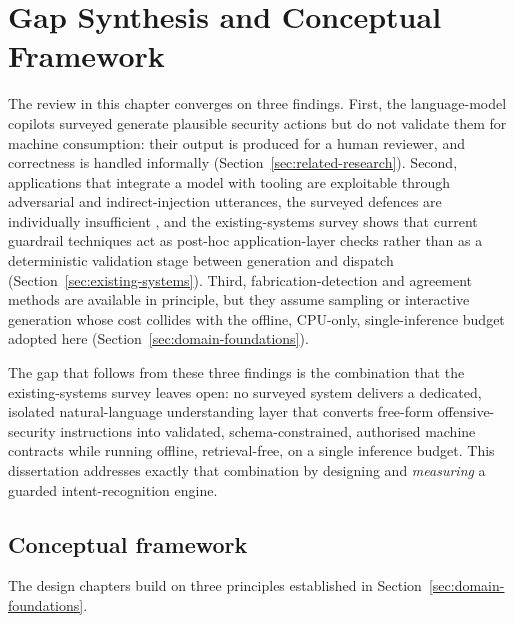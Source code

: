 
\section{Gap Synthesis and Conceptual Framework}\label{sec:gap-synthesis}

The review in this chapter converges on three findings. First, the
language-model copilots surveyed \parencite{deng2024pentestgpt,happe2023pwned}
generate plausible security actions but do not validate them for machine
consumption: their output is produced for a human reviewer, and correctness is
handled informally (Section~\ref{sec:related-research}). Second, applications
that integrate a model with tooling are exploitable through adversarial and
indirect-injection utterances, the surveyed defences are individually
insufficient \parencite{liu2023promptinjection,greshake2023indirect}, and the
existing-systems survey shows that current guardrail techniques act as
post-hoc application-layer checks rather than as a deterministic validation
stage between generation and dispatch (Section~\ref{sec:existing-systems}).
Third, fabrication-detection and agreement methods
\parencite{manakul2023selfcheckgpt,kuhn2023semantic,farquhar2024semantic,wang2023selfconsistency}
are available in principle, but they assume sampling or interactive generation
whose cost collides with the offline, CPU-only, single-inference budget adopted
here (Section~\ref{sec:domain-foundations}).

The gap that follows from these three findings is the combination that the
existing-systems survey leaves open: no surveyed system delivers a dedicated,
isolated natural-language understanding layer that converts free-form
offensive-security instructions into validated, schema-constrained, authorised
machine contracts while running offline, retrieval-free, on a single inference
budget. This dissertation addresses exactly that combination by designing and
\emph{measuring} a guarded intent-recognition engine.

\subsection*{Conceptual framework}

The design chapters build on three principles established in
Section~\ref{sec:domain-foundations}.


